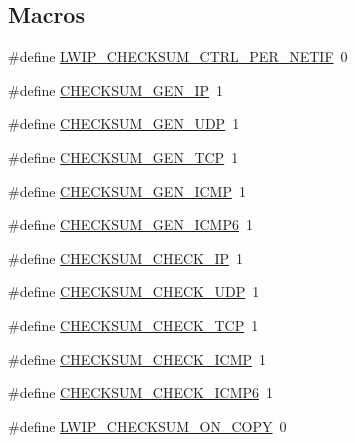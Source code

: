\subsection*{Macros}
\begin{DoxyCompactItemize}
\item 
\#define \hyperlink{group__lwip__opts__checksum_ga3ecc5246a0c6ca5aed56c2d7899c1004}{L\+W\+I\+P\+\_\+\+C\+H\+E\+C\+K\+S\+U\+M\+\_\+\+C\+T\+R\+L\+\_\+\+P\+E\+R\+\_\+\+N\+E\+T\+IF}~0
\item 
\#define \hyperlink{group__lwip__opts__checksum_ga8ddad81fc26268a13b35091781da2265}{C\+H\+E\+C\+K\+S\+U\+M\+\_\+\+G\+E\+N\+\_\+\+IP}~1
\item 
\#define \hyperlink{group__lwip__opts__checksum_ga98d460f8c2baed8bf62d5473831c0b2c}{C\+H\+E\+C\+K\+S\+U\+M\+\_\+\+G\+E\+N\+\_\+\+U\+DP}~1
\item 
\#define \hyperlink{group__lwip__opts__checksum_ga800069963cc4552b99235237c22f00bb}{C\+H\+E\+C\+K\+S\+U\+M\+\_\+\+G\+E\+N\+\_\+\+T\+CP}~1
\item 
\#define \hyperlink{group__lwip__opts__checksum_ga2291ec5bec0a551545da6d5f9f9316b2}{C\+H\+E\+C\+K\+S\+U\+M\+\_\+\+G\+E\+N\+\_\+\+I\+C\+MP}~1
\item 
\#define \hyperlink{group__lwip__opts__checksum_ga7cd47a55af03b1048c5a4a5fe0e76013}{C\+H\+E\+C\+K\+S\+U\+M\+\_\+\+G\+E\+N\+\_\+\+I\+C\+M\+P6}~1
\item 
\#define \hyperlink{group__lwip__opts__checksum_ga005b1b9988b84a2cb844144cef22c11e}{C\+H\+E\+C\+K\+S\+U\+M\+\_\+\+C\+H\+E\+C\+K\+\_\+\+IP}~1
\item 
\#define \hyperlink{group__lwip__opts__checksum_ga6747f7b72abe544fd4dc184cc7fcad37}{C\+H\+E\+C\+K\+S\+U\+M\+\_\+\+C\+H\+E\+C\+K\+\_\+\+U\+DP}~1
\item 
\#define \hyperlink{group__lwip__opts__checksum_gab676cc29571b7ffda12336482ad97699}{C\+H\+E\+C\+K\+S\+U\+M\+\_\+\+C\+H\+E\+C\+K\+\_\+\+T\+CP}~1
\item 
\#define \hyperlink{group__lwip__opts__checksum_ga79807171be8c20b69a5cd8de83566d25}{C\+H\+E\+C\+K\+S\+U\+M\+\_\+\+C\+H\+E\+C\+K\+\_\+\+I\+C\+MP}~1
\item 
\#define \hyperlink{group__lwip__opts__checksum_gaf466a10b093489910a773fd1cec74c2d}{C\+H\+E\+C\+K\+S\+U\+M\+\_\+\+C\+H\+E\+C\+K\+\_\+\+I\+C\+M\+P6}~1
\item 
\#define \hyperlink{group__lwip__opts__checksum_ga9f60183f0442bdbeefd6b395c6647613}{L\+W\+I\+P\+\_\+\+C\+H\+E\+C\+K\+S\+U\+M\+\_\+\+O\+N\+\_\+\+C\+O\+PY}~0
\item 

\end{DoxyCompactItemize}
